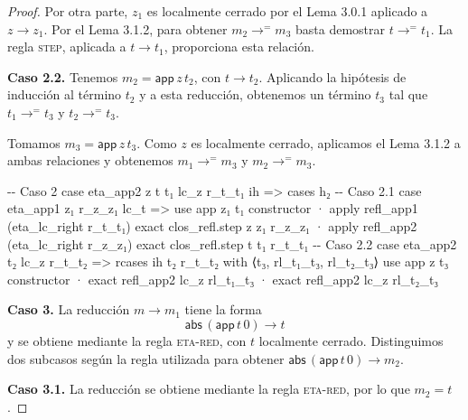 \documentclass[
  spanish,
  letterpaper,
  DIV=11,
  numbers=noendperiod]{scrreprt}
\newenvironment{Shaded}{\begin{snugshade}}{\end{snugshade}}
\newcommand{\CommentTok}[1]{\textcolor[rgb]{0.37,0.37,0.37}{#1}}
\newcommand{\KeywordTok}[1]{\textcolor[rgb]{0.00,0.23,0.31}{\textbf{#1}}}
\newcommand{\NormalTok}[1]{\textcolor[rgb]{0.00,0.23,0.31}{#1}}
\renewcommand{\NormalTok}[1]{\textcolor[HTML]{000000}{#1}}
\renewcommand{\KeywordTok}[1]{\textcolor[HTML]{0000FF}{#1}}
\renewcommand{\CommentTok}[1]{\textcolor[HTML]{008000}{#1}}
\theoremstyle{remark}
\begin{document}
\begin{proof}
Por otra parte, \(z_1\) es localmente cerrado por el Lema 3.0.1 aplicado
a \(z\longrightarrow z_1\). Por el Lema 3.1.2, para obtener
\(m_2\longrightarrow^{=}m_3\) basta demostrar
\(t\longrightarrow^{=}t_1\). La regla \textsc{step}, aplicada a
\(t\longrightarrow t_1\), proporciona esta relación.

\textbf{Caso 2.2.} Tenemos \(m_2=\mathsf{app}\,z\,t_2\), con
\(t\longrightarrow t_2\). Aplicando la hipótesis de inducción al término
\(t_2\) y a esta reducción, obtenemos un término \(t_3\) tal que
\(t_1\longrightarrow^{=}t_3\) y \(t_2\longrightarrow^{=}t_3\).

Tomamos \(m_3=\mathsf{app}\,z\,t_3\). Como \(z\) es localmente cerrado,
aplicamos el Lema 3.1.2 a ambas relaciones y obtenemos
\(m_1\longrightarrow^{=}m_3\) y \(m_2\longrightarrow^{=}m_3\).

\begin{Shaded}
\begin{Highlighting}[]
  \CommentTok{{-}{-} Caso 2}
\NormalTok{  case eta\_app2 z t t₁ lc\_z r\_t\_t₁ ih =\textgreater{}}
\NormalTok{    cases h₂}
    \CommentTok{{-}{-} Caso 2.1}
\NormalTok{    case eta\_app1 z₁ r\_z\_z₁ lc\_t =\textgreater{}}
\NormalTok{      use app z₁ t₁}
\NormalTok{      constructor}
\NormalTok{      · }\KeywordTok{apply}\NormalTok{ refl\_app1 (eta\_lc\_right r\_t\_t₁)}
        \KeywordTok{exact}\NormalTok{ clos\_refl.step z z₁ r\_z\_z₁}
\NormalTok{      · }\KeywordTok{apply}\NormalTok{ refl\_app2 (eta\_lc\_right r\_z\_z₁)}
        \KeywordTok{exact}\NormalTok{ clos\_refl.step t t₁ r\_t\_t₁}
    \CommentTok{{-}{-} Caso 2.2}
\NormalTok{    case eta\_app2 t₂ lc\_z r\_t\_t₂ =\textgreater{}}
\NormalTok{      rcases ih t₂ r\_t\_t₂ }\KeywordTok{with}\NormalTok{ ⟨t₃, rl\_t₁\_t₃, rl\_t₂\_t₃⟩}
\NormalTok{      use app z t₃}
\NormalTok{      constructor}
\NormalTok{      · }\KeywordTok{exact}\NormalTok{ refl\_app2 lc\_z rl\_t₁\_t₃}
\NormalTok{      · }\KeywordTok{exact}\NormalTok{ refl\_app2 lc\_z rl\_t₂\_t₃}
\end{Highlighting}
\end{Shaded}

\textbf{Caso 3.} La reducción \(m\longrightarrow m_1\) tiene la forma \[
\mathsf{abs}\,(\mathsf{app}\,t\,0)\longrightarrow t
\] y se obtiene mediante la regla \textsc{eta-red}, con \(t\) localmente
cerrado. Distinguimos dos subcasos según la regla utilizada para obtener
\(\mathsf{abs}\,(\mathsf{app}\,t\,0)\longrightarrow m_2\).

\textbf{Caso 3.1.} La reducción se obtiene mediante la regla
\textsc{eta-red}, por lo que \(m_2=t\).


\end{proof}
\end{document}
